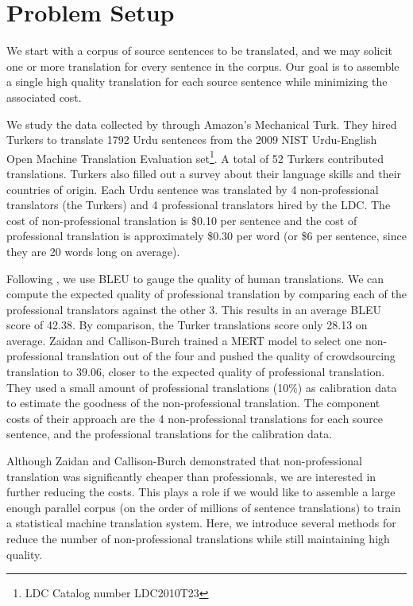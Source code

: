 \documentclass[11pt,letterpaper]{article}
\begin{document}
\section{Problem Setup}

We start with a corpus of source sentences to be translated, and we may solicit one or more translation for every sentence in the corpus.  Our goal is to assemble a single high quality translation for each source sentence while minimizing the associated cost. 

We study the data collected by  through Amazon's Mechanical Turk. 
They hired Turkers to translate 1792 Urdu sentences 
from the  2009 NIST Urdu-English Open Machine Translation Evaluation set\footnote{LDC Catalog number LDC2010T23}. A total of 52 Turkers contributed translations. Turkers also filled out a survey about their language skills and their countries of origin. Each Urdu sentence was translated by 4 non-professional translators (the Turkers) and 4 professional translators hired by the LDC. The cost of non-professional translation is  \$0.10 per sentence and the cost of professional translation is approximately \$0.30 per word (or \$6 per sentence, since they are 20 words long on average). 

Following , we use BLEU \cite{papineni2002bleu} to gauge the quality of human translations.  We can compute the expected quality of professional translation by comparing each of the professional translators against the other 3.  This results in an average BLEU score of  42.38.  By comparison, the Turker translations score only 28.13 on average. Zaidan and Callison-Burch trained a MERT model to select one non-professional translation out of the four and pushed the quality of crowdsourcing translation to 39.06, closer to the expected quality of professional translation. They used a small amount of professional translations (10\%) as calibration data to estimate the goodness of the non-professional translation. The component costs of their approach are the 4 non-professional translations for each source sentence, and the professional translations for the calibration data.

Although Zaidan and Callison-Burch demonstrated that non-professional translation was significantly cheaper than professionals, we are interested in further reducing the costs.  This plays a role if we would like to assemble a large enough parallel corpus (on the order of millions of sentence translations) to train a statistical machine translation system. 
Here, we introduce several methods for reduce the number of non-professional translations  while still maintaining high quality. 
\end{document}

